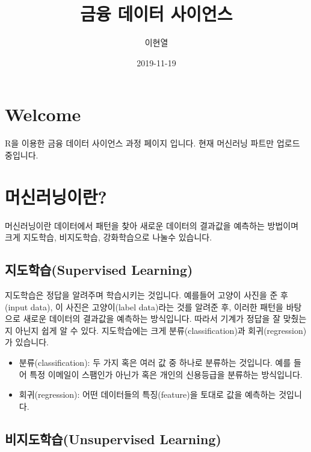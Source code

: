 \documentclass[12pt,]{book}
\title{금융 데이터 사이언스}
\author{이현열}
\date{2019-11-19}
\begin{document}
\maketitle

{
\setcounter{tocdepth}{1}
\tableofcontents
}
\hypertarget{welcome}{%
\chapter*{Welcome}\label{welcome}}

R을 이용한 금융 데이터 사이언스 과정 페이지 입니다.
현재 머신러닝 파트만 업로드 중입니다.

\hypertarget{uxba38uxc2e0uxb7ecuxb2dduxc774uxb780}{%
\chapter{머신러닝이란?}\label{uxba38uxc2e0uxb7ecuxb2dduxc774uxb780}}

머신러닝이란 데이터에서 패턴을 찾아 새로운 데이터의 결과값을 예측하는 방법이며 크게 지도학습, 비지도학습, 강화학습으로 나눌수 있습니다.

\hypertarget{uxc9c0uxb3c4uxd559uxc2b5supervised-learning}{%
\section{지도학습(Supervised Learning)}\label{uxc9c0uxb3c4uxd559uxc2b5supervised-learning}}

지도학습은 정답을 알려주며 학습시키는 것입니다. 예를들어 고양이 사진을 준 후(input data), 이 사진은 고양이(label data)라는 것를 알려준 후, 이러한 패턴을 바탕으로 새로운 데이터의 결과값을 예측하는 방식입니다. 따라서 기계가 정답을 잘 맞췄는지 아닌지 쉽게 알 수 있다. 지도학습에는 크게 분류(classification)과 회귀(regression)가 있습니다.

\begin{itemize}
\item
  분류(classification): 두 가지 혹은 여러 값 중 하나로 분류하는 것입니다. 예를 들어 특정 이메일이 스팸인가 아닌가 혹은 개인의 신용등급을 분류하는 방식입니다.
\item
  회귀(regression): 어떤 데이터들의 특징(feature)을 토대로 값을 예측하는 것입니다.
\end{itemize}

\hypertarget{uxbe44uxc9c0uxb3c4uxd559uxc2b5unsupervised-learning}{%
\section{비지도학습(Unsupervised Learning)}\label{uxbe44uxc9c0uxb3c4uxd559uxc2b5unsupervised-learning}}
\end{document}
